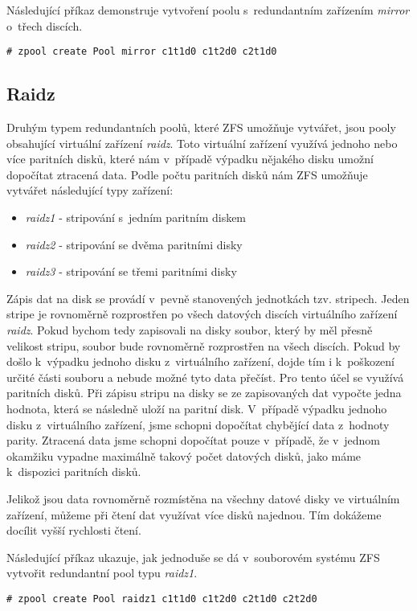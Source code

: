 Následující příkaz demonstruje vytvoření poolu s~redundantním zařízením \emph{mirror} o~třech discích.
\begin{verbatim}
# zpool create Pool mirror c1t1d0 c1t2d0 c2t1d0
\end{verbatim}

\subsection{Raidz}
Druhým typem redundantních poolů, které ZFS umožňuje vytvářet, jsou pooly obsahující virtuální zařízení \emph{raidz}. Toto virtuální zařízení využívá jednoho nebo více paritních disků, které nám v~případě výpadku nějakého disku umožní dopočítat ztracená data. Podle počtu paritních disků nám ZFS umožňuje vytvářet následující typy zařízení:
\begin{itemize}
  \item \emph{raidz1} - stripování s~jedním paritním diskem
  \item \emph{raidz2} - stripování se dvěma paritními disky
  \item \emph{raidz3} - stripování se třemi paritními disky
\end{itemize}

Zápis dat na disk se provádí v~pevně stanovených jednotkách tzv. stripech. Jeden stripe je rovnoměrně rozprostřen po všech datových discích virtuálního zařízení \emph{raidz}. Pokud bychom tedy zapisovali na disky soubor, který by měl přesně velikost stripu, soubor bude rovnoměrně rozprostřen na všech discích. Pokud by došlo k~výpadku jednoho disku z~virtuálního zařízení, dojde tím i k~poškození určité části souboru a nebude možné tyto data přečíst. Pro tento účel se využívá paritních disků. Při zápisu stripu na disky se ze zapisovaných dat vypočte jedna hodnota, která se následně uloží na paritní disk. V~případě výpadku jednoho disku z~virtuálního zařízení, jsme schopni dopočítat chybějící data z~hodnoty parity. Ztracená data jsme schopni dopočítat pouze v~případě, že v~jednom okamžiku vypadne maximálně takový počet datových disků, jako máme k~dispozici paritních disků.

Jelikož jsou data rovnoměrně rozmístěna na všechny datové disky ve virtuálním zařízení, můžeme při čtení dat využívat více disků najednou. Tím dokážeme docílit vyšší rychlosti čtení.

Následující příkaz ukazuje, jak jednoduše se dá v~souborovém systému ZFS vytvořit redundantní pool typu \emph{raidz1}.
\begin{verbatim}
# zpool create Pool raidz1 c1t1d0 c1t2d0 c2t1d0 c2t2d0
\end{verbatim}

